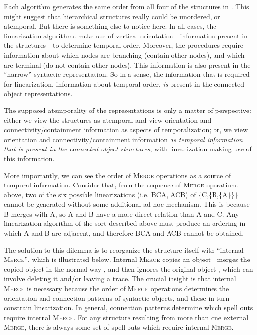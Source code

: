   Each algorithm generates the same order from all four of the structures in . This might suggest that hierarchical structures really could be unordered, or atemporal. But there is something else to notice here. In all cases, the linearization algorithms make use of vertical orientation—information present in the structures—to determine temporal order. Moreover, the procedures require information about which nodes are branching (contain other nodes), and which are terminal (do not contain other nodes). This information is also present in the “narrow” syntactic representation. So in a sense, the information that is required for linearization, information about temporal order, \textit{is} present in the connected object representations. 

  The supposed atemporality of the representations is only a matter of perspective: either we view the structures as atemporal and view orientation and connectivity/containment information as aspects of temporalization; or, we view orientation and connectivity/containment information \textit{as temporal information that is present in the connected object structures}, with linearization making use of this information. 

  More importantly, we can see the order of \textsc{Merge} operations as a source of temporal information. Consider that, from the sequence of \textsc{Merge} operations above, two of the six possible linearizations (i.e. BCA, ACB) of \{C,\{B,\{A\}\}\} cannot be generated without some additional ad hoc mechanism. This is because B merges with A, so A and B have a more direct relation than A and C. Any linearization algorithm of the sort described above must produce an ordering in which A and B are adjacent, and therefore BCA and ACB cannot be obtained.

  The solution to this dilemma is to reorganize the structure itself with “internal \textsc{Merge}”, which is illustrated below. Internal \textsc{Merge} copies an object , merges the copied object in the normal way , and then ignores the original object , which can involve deleting it and/or leaving a trace. The crucial insight is that internal \textsc{Merge} is necessary because the order of \textsc{Merge} operations determines the orientation and connection patterns of syntactic objects, and these in turn constrain linearization. In general, connection patterns determine which spell outs require internal \textsc{Merge}. For any structure resulting from more than one external \textsc{Merge}, there is always some set of spell outs which require internal \textsc{Merge}.

